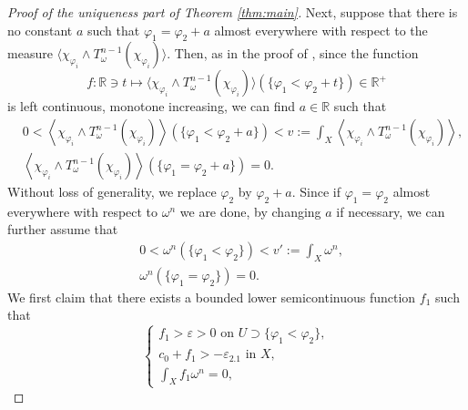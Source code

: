 \documentclass{amsart}
\numberwithin{equation}{section}
\theoremstyle{plain}
\theoremstyle{definition}
\theoremstyle{remark}
\begin{document}
\begin{proof}[Proof of the uniqueness part of Theorem \ref{thm:main}]
    Next, suppose that there is no constant $a$ such that $\varphi_1=\varphi_2+a$ almost everywhere with respect to the measure $\langle\chi_{\varphi_i}\wedge T^{n-1}_\omega(\chi_{\varphi_i})\rangle$. Then, as in the proof of \cite[Corollary 1.10]{GZ}, since the function
    $$f:\mathbb{R}\ni t\mapsto \langle\chi_{\varphi_i}\wedge T^{n-1}_\omega(\chi_{\varphi_i})\rangle(\{\varphi_1<\varphi_2+t\})\in\mathbb{R}^+$$
    is left continuous, monotone increasing, we can find $a\in\mathbb{R}$ such that  
    \begin{equation}\label{eq:mass}
    \begin{split}
        &0<\left\langle\chi_{\varphi_i}\wedge T^{n-1}_\omega(\chi_{\varphi_i})\right\rangle(\{\varphi_1<\varphi_2+a\})<v:=\int_X\left\langle\chi_{\varphi_i}\wedge T^{n-1}_\omega(\chi_{\varphi_i})\right\rangle,\\
        &\left\langle\chi_{\varphi_i}\wedge T^{n-1}_\omega(\chi_{\varphi_i})\right\rangle(\{\varphi_1=\varphi_2+a\})=0.
    \end{split}
    \end{equation}
    Without loss of generality, we replace $\varphi_2$ by $\varphi_2+a$.
    Since if $\varphi_1=\varphi_2$ almost everywhere with respect to $\omega^n$ we are done, by changing $a$ if necessary, we can further assume that
    \begin{equation}\label{eq:lebesguemass}
        \begin{split}
        &0<\omega^n(\{\varphi_1<\varphi_2\})<v':=\int_X\omega^n,\\
        &\omega
        ^n(\{\varphi_1=\varphi_2\})=0.
    \end{split}
    \end{equation}
    We first claim that there exists a bounded lower semicontinuous function $f_1$ such that 
    \begin{equation}\label{eq:f_1}
        \begin{cases}
            f_1>\varepsilon>0 \text{ on } U\supset \{\varphi_1<\varphi_2\}, \\
            c_0+f_1>-\varepsilon_{2.1} \text{ in } X,  \\
            \int_X f_1 \omega^n=0,
        \end{cases}
    \end{equation}

\end{proof}
\end{document}
